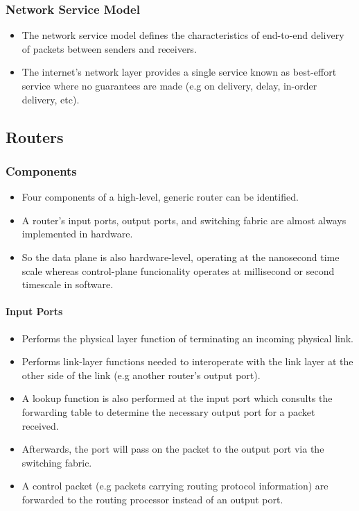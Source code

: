 \documentclass{article}
\begin{document}
\subsubsection{Network Service Model}

\begin{itemize}
    \item The network service model defines the characteristics of end-to-end delivery of packets between senders and receivers.
    \item The internet's network layer provides a single service known as best-effort service where no guarantees are made (e.g on delivery, delay, in-order delivery, etc).
\end{itemize}

\subsection{Routers}

\subsubsection{Components}

\begin{itemize}
    \item Four components of a high-level, generic router can be identified.
    \item A router's input ports, output ports, and switching fabric are almost always implemented in hardware.
    \item So the data plane is also hardware-level, operating at the nanosecond time scale whereas control-plane funcionality operates at millisecond or second timescale in software.
\end{itemize}

\paragraph{Input Ports}

\begin{itemize}
    \item Performs the physical layer function of terminating an incoming physical link.
    \item Performs link-layer functions needed to interoperate with the link layer at the other side of the link (e.g another router's output port).
    \item A lookup function is also performed at the input port which consults the forwarding table to determine the necessary output port for a packet received.
    \item Afterwards, the port will pass on the packet to the output port via the switching fabric.
    \item A control packet (e.g packets carrying routing protocol information) are forwarded to the routing processor instead of an output port.
\end{itemize}
\end{document}
